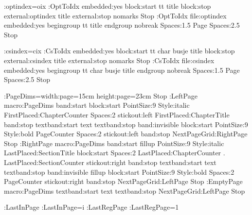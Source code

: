 \def\opt#1{{\tt#1}}
\DefineExternalFile:optindex=oix
\def\refopt#1{\OptToIdx #1\par}
\DefineHeading:OptToIdx embedded:yes
    block:start tt title block:stop
    external:optindex title external:stop 
    nomarks Stop
\DefineExternalItem:OptToIdx file:optindex
    embedded:yes
    begingroup tt title endgroup 
    nobreak Spaces:1.5 Page Spaces:2.5 Stop

\DefineExternalFile:csindex=cix
\def\refcs#1{\CsToIdx #1\par}
\DefineHeading:CsToIdx embedded:yes
    block:start tt char busje title block:stop
    external:csindex title external:stop 
    nomarks Stop
\DefineExternalItem:CsToIdx file:csindex
    embedded:yes
    begingroup tt char busje title endgroup
    nobreak Spaces:1.5 Page Spaces:2.5 Stop

\OptionsMacro:PageDims=width:page=15cm height:page=23cm Stop
\DefinePageGrid:LeftPage macro:PageDims
    band:start block:start PointSize:9 Style:italic
               FirstPlaced:ChapterCounter Spaces:2 stickout:left
         FirstPlaced:ChapterTitle band:stop
    textband:start text textband:stop
    band:invisible block:start PointSize:9 Style:bold
         PageCounter Spaces:2 stickout:left band:stop
    NextPageGrid:RightPage Stop
\DefinePageGrid:RightPage macro:PageDims
    band:start fillup PointSize:9 Style:italic
        LastPlaced:SectionTitle
        block:start Spaces:2 LastPlaced:ChapterCounter . 
            LastPlaced:SectionCounter stickout:right
        band:stop
    textband:start text textband:stop
    band:invisible fillup 
        block:start PointSize:9 Style:bold Spaces:2
            PageCounter stickout:right band:stop
    NextPageGrid:LeftPage Stop
\DefinePageGrid:EmptyPage macro:PageDims
    textband:start text textband:stop
    NextPageGrid:LeftPage Stop

\AdaptiveCounter:LastInPage \CounterRepresentation:LastInPage=i
\AdaptiveCounter:LastRegPage \CounterRepresentation:LastRegPage=1

\endinput

